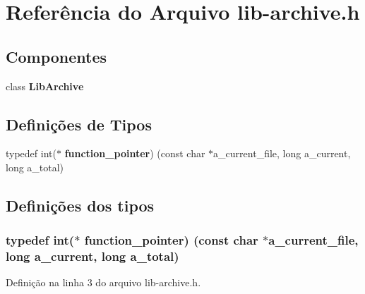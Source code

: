 \section{Referência do Arquivo lib-\/archive.h}
\label{lib-archive_8h}
\subsection*{Componentes}
\begin{DoxyCompactItemize}
\item 
class {\bf Lib\+Archive}
\end{DoxyCompactItemize}
\subsection*{Definições de Tipos}
\begin{DoxyCompactItemize}
\item 
typedef int($\ast$ {\bf function\+\_\+pointer}) (const char $\ast$a\+\_\+current\+\_\+file, long a\+\_\+current, long a\+\_\+total)
\end{DoxyCompactItemize}


\subsection{Definições dos tipos}
\subsubsection[{function\+\_\+pointer}]{\setlength{\rightskip}{0pt plus 5cm}typedef int($\ast$ function\+\_\+pointer) (const char $\ast$a\+\_\+current\+\_\+file, long a\+\_\+current, long a\+\_\+total)}\label{lib-archive_8h_a9cccccf20c87875939238f45f40ff992}


Definição na linha 3 do arquivo lib-\/archive.\+h.


